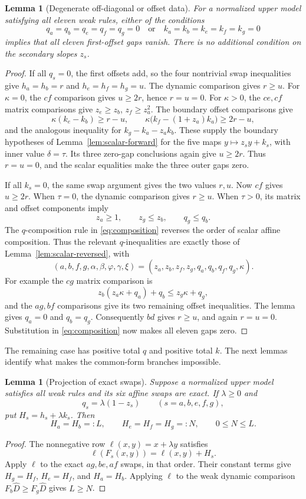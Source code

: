 \documentclass[11pt,a4paper]{article}
\newtheorem{lemma}[theorem]{Lemma}
\begin{document}
\begin{lemma}[Degenerate off-diagonal or offset data]\label{lem:upper-degenerate}
For a normalized upper model satisfying all eleven weak rules,
either of the conditions
\[
q_a=q_b=q_e=q_f=q_g=0
\quad\text{or}\quad
k_a=k_b=k_e=k_f=k_g=0
\]
implies that all eleven first-offset gaps vanish.
There is no additional condition on the secondary slopes \(z_s\).
\end{lemma}
\begin{proof}
If all \(q_s=0\), the first offsets add, so the four nontrivial swap
inequalities give \(h_a=h_b=r\) and \(h_e=h_f=h_g=u\).
The dynamic comparison gives \(r\ge u\).
For \(\kappa=0\), the \(cf\) comparison gives \(u\ge2r\),
hence \(r=u=0\). For \(\kappa>0\), the \(ce,cf\) matrix
comparisons give \(z_e\ge z_b\), \(z_f\ge z_a^2\).
The boundary offset comparisons give
\[
\kappa(k_e-k_b)\ge r-u,\qquad
\kappa\bigl(k_f-(1+z_a)k_a\bigr)\ge2r-u,
\]
and the analogous inequality for \(k_g-k_a-z_ak_b\).
These supply the boundary hypotheses of
Lemma~\ref{lem:scalar-forward} for the five maps
\(y\mapsto z_sy+k_s\), with inner value \(\delta=\tau\).
Its three zero-gap conclusions again give \(u\ge2r\).
Thus \(r=u=0\), and the scalar equalities make the three outer gaps zero.

If all \(k_s=0\), the same swap argument gives the two values \(r,u\).
Now \(cf\) gives \(u\ge2r\).
When \(\tau=0\), the dynamic comparison gives \(r\ge u\).
When \(\tau>0\), its matrix and offset components imply
\[
z_a\ge1,\qquad z_g\le z_b,\qquad q_g\le q_b.
\]
The \(q\)-composition rule in \eqref{eq:composition} reverses the order
of scalar affine composition. Thus the relevant \(q\)-inequalities are
exactly those of Lemma~\ref{lem:scalar-reversed}, with
\[
(a,b,f,g,\alpha,\beta,\varphi,\gamma,\xi)
=(z_a,z_b,z_f,z_g,q_a,q_b,q_f,q_g,\kappa).
\]
For example the \(cg\) matrix comparison is
\[
z_b(z_a\kappa+q_a)+q_b\le z_g\kappa+q_g,
\]
and the \(ag,bf\) comparisons give its two remaining offset inequalities.
The lemma gives \(q_a=0\) and \(q_b=q_g\).
Consequently \(bd\) gives \(r\ge u\), and again \(r=u=0\).
Substitution in \eqref{eq:composition} now makes all eleven gaps zero.
\end{proof}

The remaining case has positive total \(q\) and positive total \(k\).
The next lemmas identify what makes the common-form branches impossible.

\begin{lemma}[Projection of exact swaps]\label{lem:projected-offsets}
Suppose a normalized upper model satisfies all weak rules and its six
affine swaps are exact. If \(\lambda\ge0\) and
\[
q_s=\lambda(1-z_s)\qquad(s=a,b,e,f,g),
\]
put \(H_s=h_s+\lambda k_s\). Then
\[
H_a=H_b=:L,\qquad H_e=H_f=H_g=:N,\qquad 0\le N\le L.
\]
\end{lemma}
\begin{proof}
The nonnegative row \(\ell(x,y)=x+\lambda y\) satisfies
\[
\ell(F_s(x,y))=\ell(x,y)+H_s.
\]
Apply \(\ell\) to the exact \(ag,be,af\) swaps, in that order.
Their constant terms give \(H_g=H_f\), \(H_e=H_f\), and \(H_a=H_b\).
Applying \(\ell\) to the weak dynamic comparison
\(F_b\widehat D\ge F_g\widehat D\) gives \(L\ge N\).
\end{proof}
\end{document}
